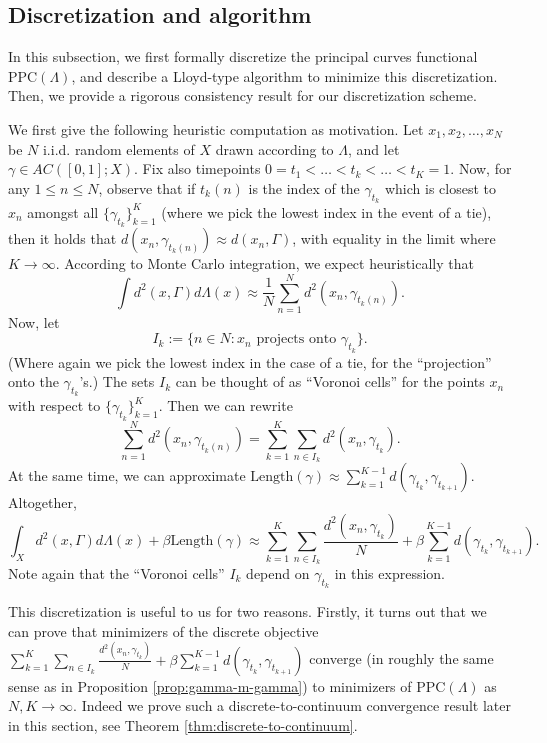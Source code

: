 \documentclass[aos, preprint]{imsart}
\theoremstyle{plain}
\theoremstyle{remark}
\begin{document}
\subsection{Discretization and algorithm}
\label{subsec:discrete-to-continuum}

In this subsection, we first formally discretize the principal curves functional $\mathrm{PPC}(\Lambda)$, and describe a Lloyd-type algorithm to minimize this discretization. Then, we provide a rigorous consistency result for our discretization scheme.

We first give the following heuristic computation as motivation. Let $x_{1},x_{2},\ldots,x_{N}$ be $N$ i.i.d. random elements of
$X$ drawn according to $\Lambda$, and let $\gamma\in AC([0,1];X)$.
Fix also timepoints $0=t_{1}<\ldots<t_{k}<\ldots<t_{K}=1$. Now, for
any $1\leq n\leq N$, observe that if $t_{k}(n)$ is the index of
the $\gamma_{t_{k}}$ which is closest to $x_{n}$ amongst all $\{\gamma_{t_{k}}\}_{k=1}^{K}$
(where we pick the lowest index in the event of a tie), then it holds
that $d(x_{n},\gamma_{t_{k}(n)})\approx d(x_{n},\Gamma)$, with equality in the limit where $K \to\infty$. According
to Monte Carlo integration, we expect heuristically that
\[
\int d^{2}(x,\Gamma)d\Lambda(x)\approx\frac{1}{N}\sum_{n=1}^{N}d^{2}(x_{n},\gamma_{t_{k}(n)}).
\]
Now, let
\[
I_{k}:=\{n\in N:x_{n}\text{ projects onto }\gamma_{t_{k}}\}.
\]
(Where again we pick the lowest index in the case of a tie, for the
``projection'' onto the $\gamma_{t_{k}}$'s.) The sets $I_k$ can be
thought of as ``Voronoi cells'' for the points $x_n$ with respect to $\{\gamma_{t_{k}}\}_{k=1}^{K}$. Then we can rewrite
\[
\sum_{n=1}^{N}d^{2}(x_{n},\gamma_{t_{k}(n)})=\sum_{k=1}^{K}\sum_{n\in I_{k}}d^{2}(x_{n},\gamma_{t_{k}}).
\]
At the same time, we can approximate $\text{Length}(\gamma)\approx\sum_{k=1}^{K-1}d(\gamma_{t_{k}},\gamma_{t_{k+1}}).$
Altogether,
\[
\int_{X}d^{2}(x,\Gamma)d\Lambda(x)+\beta\text{Length}(\gamma)\approx\sum_{k=1}^{K}\sum_{n\in I_{k}}\frac{d^{2}(x_{n},\gamma_{t_{k}})}{N}+\beta\sum_{k=1}^{K-1}d(\gamma_{t_{k}},\gamma_{t_{k+1}}).
\]
Note again that the ``Voronoi cells'' $I_{k}$ depend on $\gamma_{t_{k}}$ in this
expression.

This discretization is useful to us for two reasons. Firstly, it turns
out that we can prove that minimizers of the discrete objective
$\sum_{k=1}^{K}\sum_{n\in
  I_{k}}\frac{d^{2}(x_{n},\gamma_{t_{k}})}{N}+\beta\sum_{k=1}^{K-1}d(\gamma_{t_{k}},\gamma_{t_{k+1}})$
converge (in roughly the same sense as in Proposition
\ref{prop:gamma-m-gamma}) to minimizers of $\mathrm{PPC}(\Lambda)$ as
$N,K\rightarrow \infty$. Indeed we prove such a discrete-to-continuum
convergence result later in this section, see Theorem \ref{thm:discrete-to-continuum}.
\end{document}

